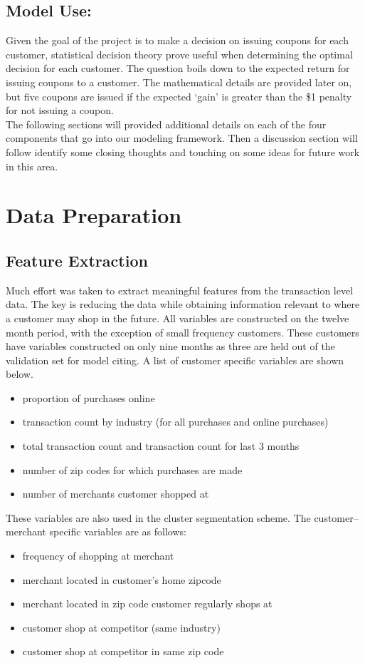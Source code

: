 \documentclass[12pt]{article} %
\begin{document}
\subsection*{Model Use:} 
Given the goal of the project is to make a decision on issuing coupons for each customer, statistical decision theory prove useful when determining the optimal decision for each customer.  The question boils down to the expected return for issuing coupons to a customer.  The mathematical details are provided later on, but five coupons are issued if the expected `gain' is greater than the \$1 penalty for not issuing a coupon.\\

The following sections will provided additional details on each of the four components that go into our modeling framework.  Then a discussion section will follow identify some closing thoughts and touching on some ideas for future work in this area. 
\section{Data Preparation}
\subsection{Feature Extraction}
Much effort was taken to extract meaningful features from the transaction level data.  The key is reducing the data while obtaining information relevant to where a customer may shop in the future.  All variables are constructed on the twelve month period, with the exception of small frequency customers.  These customers have variables constructed on only nine months as three are held out of the validation set for model citing.  A list of customer specific variables are shown below.
\small
\begin{itemize}
\item proportion of purchases online 
\item transaction count by industry (for all purchases and online purchases)
\item total transaction count and transaction count for last 3 months
\item number of zip codes for which purchases are made
\item number of merchants customer shopped at
\end{itemize}
\normalsize
These variables are also used in the cluster segmentation scheme.   The customer-- merchant specific variables are as follows:
\small
\begin{itemize}
\item frequency of shopping at merchant
\item merchant located in customer's home zipcode
\item merchant located in zip code customer regularly shops at
\item customer shop at competitor (same industry)
\item customer shop at competitor in same zip code
\end{itemize}
\normalsize
\end{document}
